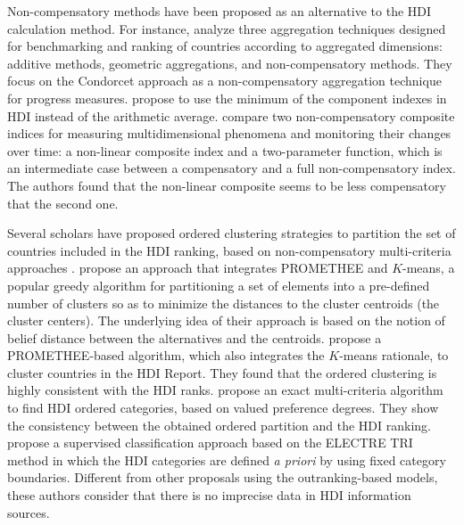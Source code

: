 \documentclass[]{elsarticle}
\theoremstyle{definition}
\begin{document}
Non-compensatory  methods have been proposed as an alternative to the HDI calculation method. For instance, \cite{Natoli2011} analyze three aggregation techniques designed for benchmarking and ranking of countries according to aggregated dimensions: additive methods, geometric aggregations, and non-compensatory methods.  They focus on the Condorcet approach as a non-compensatory aggregation technique for progress measures.  \cite{Lozano2009} propose to use the minimum of the component indexes in HDI instead of the arithmetic average. \cite{Mazziotta2015} compare two non-compensatory composite indices for measuring multidimensional phenomena and monitoring their changes over time: a non-linear composite index and a two-parameter function, which is an intermediate case between a compensatory and a full non-compensatory index. The authors found that the non-linear composite seems to be less compensatory that the second one.

Several scholars have proposed  ordered clustering strategies to partition the set of countries included in the HDI ranking,  based on non-compensatory multi-criteria approaches \citep{DeSmet2014}.   \cite{Boujelben2016} propose an approach that integrates PROMETHEE and $K$-means, a popular greedy algorithm for partitioning a set of elements into a pre-defined number of clusters so as to minimize the distances to the cluster centroids (the cluster centers). The underlying idea of their approach is based on the notion of belief distance between the alternatives and the centroids. \cite{Chen2018} propose a PROMETHEE-based algorithm, which also integrates the $K$-means rationale, to cluster countries in the HDI Report. They found that the ordered clustering is highly consistent with the HDI ranks. \cite{DeSmet2012} propose an exact multi-criteria algorithm to find HDI ordered categories, based on valued preference degrees.  They show the consistency between the obtained ordered partition and the HDI ranking.  \cite{Monteiro2018} propose a supervised classification approach based on the ELECTRE TRI method in which the HDI categories are defined \emph{a priori} by using fixed category boundaries. Different from other proposals using the outranking-based models, these authors consider that there is no imprecise data in HDI information sources. 
\end{document}
